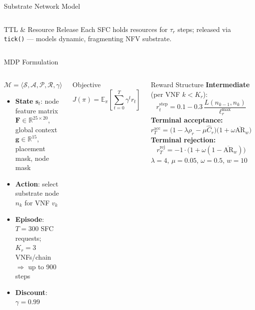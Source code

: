 \begin{frame}{Substrate Network Model}
\begin{columns}[T]
      \vspace{4pt}
      \begin{block}{TTL \& Resource Release}
        \footnotesize
        Each SFC holds resources for $\tau_r$ steps; released via \texttt{tick()} — models dynamic, fragmenting NFV substrate.
      \end{block}
  \end{columns}
\end{frame}

\begin{frame}{MDP Formulation}
  \begin{columns}[T]
      \begin{block}{$\mathcal{M} = \langle \mathcal{S}, \mathcal{A}, \mathcal{P}, \mathcal{R}, \gamma \rangle$}
        \footnotesize
        \begin{itemize}
          \item \textbf{State} $\mathbf{s}_t$: node feature matrix $\mathbf{F}\in\mathbb{R}^{25\times20}$, global context $\mathbf{g}\in\mathbb{R}^{15}$, placement mask, node mask
          \item \textbf{Action}: select substrate node $n_k$ for VNF $v_k$
          \item \textbf{Episode}: $T = 300$ SFC requests; $K_r = 3$ VNFs/chain $\Rightarrow$ up to 900 steps
          \item \textbf{Discount}: $\gamma = 0.99$
        \end{itemize}
      \end{block}
      \vspace{4pt}
      \begin{block}{Objective}
        \[J(\pi) = \mathbb{E}_{\pi}\!\left[\sum_{t=0}^{T} \gamma^t r_t\right]\]
      \end{block}
      \begin{block}{Reward Structure}
        \footnotesize
        \textbf{Intermediate} (per VNF $k < K_r$):
        \[r_t^{\text{step}} = 0.1 - 0.3\,\frac{L(n_{k-1},n_k)}{\ell_r^{\max}}\]
        \textbf{Terminal acceptance:}
        \[r_T^{\text{acc}} = \bigl(1 - \lambda\rho_r - \mu\widehat{C}_r\bigr)\bigl(1+\omega\overline{\text{AR}}_w\bigr)\]
        \textbf{Terminal rejection:}
        \[r_T^{\text{rej}} = -1 \cdot \bigl(1+\omega(1-\overline{\text{AR}}_w)\bigr)\]
        \vspace{2pt}
        $\lambda=4$, $\mu=0.05$, $\omega=0.5$, $w=10$
      \end{block}
  \end{columns}
\end{frame}
